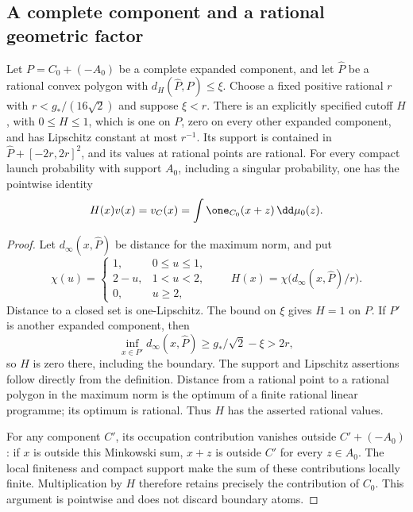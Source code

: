 \subsection{A complete component and a rational geometric factor}
\begin{lemma}
\label{lem:moment-protected-cutoff}
Let $P=C_0+(-A_0)$ be a complete expanded component, and let
$\widehat P$ be a rational convex polygon with
$d_H(\widehat P,P)\le\xi$.  Choose a fixed positive rational $r$ with
$r<g_*/(16\sqrt2)$ and suppose $\xi<r$.  There is an explicitly
specified cutoff $H$, with $0\le H\le1$, which is one on $P$, zero
on every other expanded component, and has Lipschitz constant at most
$r^{-1}$.  Its support is contained in
$\widehat P+[-2r,2r]^2$, and its values at rational points are rational.
For every compact launch probability with support $A_0$, including a
singular probability, one has the pointwise identity
\begin{equation}\label{eq:moment-cutoff-identity}
 H(x)v(x)=v_C(x)=\int\one_{C_0}(x+z)\,\dd\mu_0(z).
\end{equation}
\end{lemma}
\begin{proof}
Let $d_\infty(x,\widehat P)$ be distance for the maximum norm, and put
\[
 \chi(u)=
 \begin{cases}
 1,&0\le u\le1,\\
 2-u,&1<u<2,\\
 0,&u\ge2,
 \end{cases}
 \qquad
 H(x)=\chi\bigl(d_\infty(x,\widehat P)/r\bigr).
\]
Distance to a closed set is one-Lipschitz.  The bound on $\xi$ gives
$H=1$ on $P$.  If $P'$ is another expanded component, then
\[
 \inf_{x\in P'}d_\infty(x,\widehat P)
       \ge g_*/\sqrt2-\xi>2r,
\]
so $H$ is zero there, including the boundary.  The support and
Lipschitz assertions follow directly from the definition.  Distance
from a rational point to a rational polygon in the maximum norm is
the optimum of a finite rational linear programme; its optimum is
rational.  Thus $H$ has the asserted rational values.

For any component $C'$, its occupation contribution vanishes outside
$C'+(-A_0)$: if $x$ is outside this Minkowski sum, $x+z$ is outside
$C'$ for every $z\in A_0$.  The local finiteness and compact support
make the sum of these contributions locally finite.  Multiplication
by $H$ therefore retains precisely the contribution of $C_0$.
This argument is pointwise and does not discard boundary atoms.
\end{proof}

